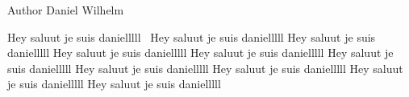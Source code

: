 \begin{DoxyAuthor}{Author}
Daniel Wilhelm
\end{DoxyAuthor}
Hey saluut je suis danielllll~\newline
Hey saluut je suis danielllll Hey saluut je suis danielllll Hey saluut je suis danielllll Hey saluut je suis danielllll Hey saluut je suis danielllll Hey saluut je suis danielllll Hey saluut je suis danielllll Hey saluut je suis danielllll Hey saluut je suis danielllll 
